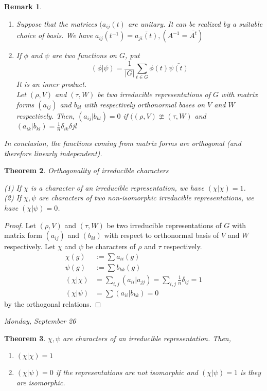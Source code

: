 \documentclass[letterpaper, leqno, 12pt]{article}
\newcommand{\fin}{\qquad \quad \hfill \framebox[1.75mm][l]{\,}}
\providecommand{\abs}[1]{\left\lvert#1\right\rvert}
\newcommand {\repV} {(\rho,V)}
\newcommand {\repW} {(\tau,W)}
\theoremstyle{stdthm}
\newtheorem{thm}{Theorem}
\theoremstyle{stddef}
\newtheorem{rem}[thm]{Remark} %
\theoremstyle{stdnonum}
\theoremstyle{stdqands}
\theoremstyle{stdbold}
\begin{document}
\begin{rem}
\begin{enumerate}
\item Suppose that the matrices $(a_{ij}(t)$ are unitary. It can be realized by a suitable choice of basis. We have $a_{ij}(t^{-1}) = \bar{a_{ji}(t)}, (A^{-1} = \bar{A^t})$
\item If $\phi$ and $\psi$ are two functions on $G$, put 
\[(\phi|\psi) = \frac{1}{\abs{G}} \sum_{t\in G} \phi(t) \bar{\psi(t)} \]
It is an inner product.\\

\noindent Let $\repV$ and $\repW$ be two irreducible representations of $G$ with matrix forms $(a_{ij})$ and $b_{kl}$ with respectively orthonormal bases on $V$ and $W$ respectively.  Then,  $(a_{ij}|b_{kl}) = 0$ if $(\repV \ncong \repW$ and $(a_{ik}|b_{kl}) = \frac{1}{n} \delta_{ik}\delta{jl}$ 
\end{enumerate}
In conclusion, the functions coming from matrix forms are orthogonal (and therefore linearly independent). 
\end{rem}

\begin{thm} Orthogonality of irreducible characters

\noindent (1) If $\chi$ is a character of an irreducible representation, we have $(\chi|\chi) = 1$.\\

\noindent (2) If $\chi,\psi$ are characters of two non-isomorphic irreducible representations, we have $(\chi|\psi) = 0$.  
\end{thm}
\begin{proof}
Let $\repV$ and $\repW$ be two irreducible representations of $G$ with matrix form $(a_{ij})$ and $(b_{kl})$ with respect to orthonormal basis of $V$ and $W$ respectively. Let $\chi$ and $\psi$ be characters of $\rho$ and $\tau$ respectively.  
\begin{align*}
\chi(g) &:= \sum a_{ii}(g)\\
\psi(g) &:= \sum b_{kk}(g)\\
(\chi|\chi) &= \sum_{i,j} (a_{ii}|a_{jj}) = \sum_{i,j} \frac{1}{n}\delta_{ij} =1 \\
(\chi|\psi) &= \sum(a_{ii}|b_{kk}) = 0
\end{align*}
by the orthogonal relations. 
\end{proof}

\begin{center}
\emph{Monday, September 26}
\end{center}
\begin{thm}
$\chi,\psi$ are characters of an irreducible representation. Then,
\begin{enumerate}
\item $(\chi|\chi) = 1$
\item $(\chi|\psi) = 0$ if the representations are not isomorphic and $(\chi|\psi)=1$ is they are isomorphic. 
\end{enumerate}
\end{thm}
\end{document}
